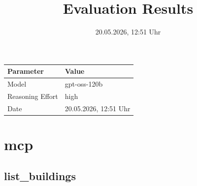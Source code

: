 \documentclass[a4paper,11pt]{article}
\title{Evaluation Results}
\date{20.05.2026, 12:51 Uhr}
\begin{document}
\maketitle

\begin{table}[H]
\centering
\begin{tabular}{l l}
\toprule
\textbf{Parameter} & \textbf{Value} \\
\midrule
Model & gpt-oss-120b \\
Reasoning Effort & high \\
Date & 20.05.2026, 12:51 Uhr \\
\bottomrule
\end{tabular}
\end{table}

\tableofcontents
\clearpage

\section{mcp}

\subsection{list\_buildings}
\end{document}
